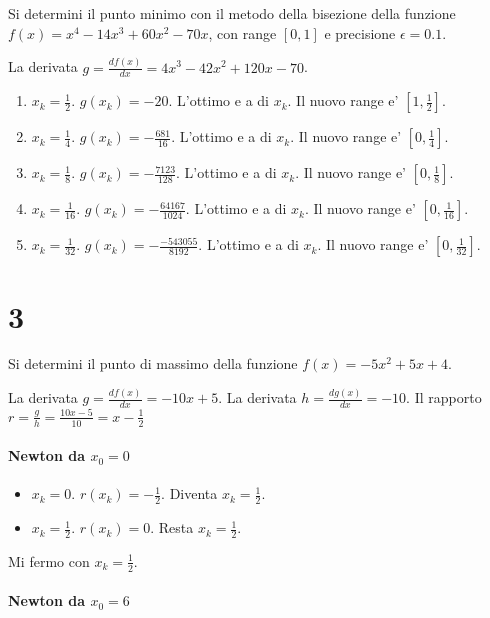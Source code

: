 Si determini il punto minimo con il metodo della bisezione della funzione $f(x) = x^4 - 14x^3 + 60x^2 - 70x$, con range $[0,1]$ e precisione $\epsilon = 0.1$.

La derivata $g = \frac {df(x)} {dx} = 4x^3 - 42x^2 + 120x - 70$.

\begin{enumerate}
    \item $x_k = \frac 1 2$. $g(x_k) = -20$. L'ottimo e a di $x_k$. Il nuovo range e' $[1, \frac 1 2]$.
    \item $x_k = \frac 1 {4}$. $g(x_k) = -\frac {681} {16}$. L'ottimo e a di $x_k$. Il nuovo range e' $[0, \frac {1} {4}]$.
    \item $x_k = \frac 1 {8}$. $g(x_k) = -\frac {7123} {128}$. L'ottimo e a di $x_k$. Il nuovo range e' $[0, \frac {1} {8}]$.
    \item $x_k = \frac 1 {16}$. $g(x_k) = -\frac {64167} {1024}$. L'ottimo e a di $x_k$. Il nuovo range e' $[0, \frac {1} {16}]$.
    \item $x_k = \frac 1 {32}$. $g(x_k) = -\frac {-543055} {8192}$. L'ottimo e a di $x_k$. Il nuovo range e' $[0, \frac {1} {32}]$.
\end{enumerate}

\section{3}

Si determini il punto di massimo della funzione $f(x) = -5x^2 + 5x + 4$.

La derivata $g = \frac {df(x)} {dx} = -10x + 5$.
La derivata $h = \frac {dg(x)} {dx} = -10$.
Il rapporto $r = \frac g h = \frac {10x - 5} {10} = x - \frac 1 2$

\paragraph{Newton da $x_0 = 0$}

\begin{itemize}
    \item $x_k = 0$. $r(x_k) = - \frac 1 2$. Diventa $x_k = \frac 1 2$.
    \item $x_k = \frac 1 2$. $r(x_k) = 0$. Resta $x_k = \frac 1 2$.
\end{itemize}

Mi fermo con $x_k = \frac 1 2$.

\paragraph{Newton da $x_0 = 6$}

